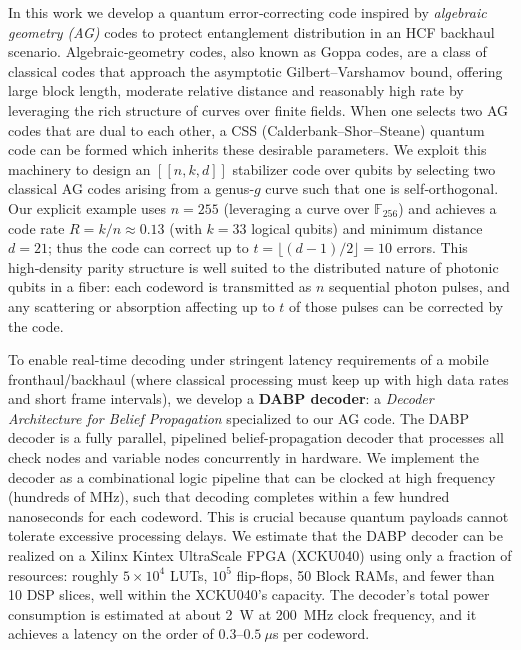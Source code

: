 \documentclass[conference]{IEEEtran}  %
\begin{document}
In this work we develop a quantum error‑correcting code inspired by \emph{algebraic geometry (AG)} codes to protect entanglement distribution in an HCF backhaul scenario.  Algebraic‑geometry codes, also known as Goppa codes, are a class of classical codes that approach the asymptotic Gilbert–Varshamov bound, offering large block length, moderate relative distance and reasonably high rate by leveraging the rich structure of curves over finite fields\cite{Nourozi2025,Steane1999}.  When one selects two AG codes that are dual to each other, a CSS (Calderbank–Shor–Steane) quantum code can be formed which inherits these desirable parameters\cite{Cross2009}.  We exploit this machinery to design an $[[n,k,d]]$ stabilizer code over qubits by selecting two classical AG codes arising from a genus‑$g$ curve such that one is self‑orthogonal.  Our explicit example uses $n=255$ (leveraging a curve over $\mathbb{F}_{256}$) and achieves a code rate $R=k/n \approx 0.13$ (with $k=33$ logical qubits) and minimum distance $d=21$; thus the code can correct up to $t=\lfloor (d-1)/2 \rfloor =10$ errors.  This high‑density parity structure is well suited to the distributed nature of photonic qubits in a fiber: each codeword is transmitted as $n$ sequential photon pulses, and any scattering or absorption affecting up to $t$ of those pulses can be corrected by the code.

To enable real-time decoding under stringent latency requirements of a mobile fronthaul/backhaul (where classical processing must keep up with high data rates and short frame intervals), we develop a \textbf{DABP decoder}: a \emph{Decoder Architecture for Belief Propagation} specialized to our AG code. The DABP decoder is a fully parallel, pipelined belief-propagation decoder that processes all check nodes and variable nodes concurrently in hardware. We implement the decoder as a combinational logic pipeline that can be clocked at high frequency (hundreds of MHz), such that decoding completes within a few hundred nanoseconds for each codeword. This is crucial because quantum payloads cannot tolerate excessive processing delays. We estimate that the DABP decoder can be realized on a Xilinx Kintex UltraScale FPGA (XCKU040) using only a fraction of resources: roughly $5\times 10^4$ LUTs, $10^5$ flip-flops, 50 Block RAMs, and fewer than 10 DSP slices, well within the XCKU040's capacity. The decoder's total power consumption is estimated at about 2~W at 200~MHz clock frequency, and it achieves a latency on the order of $0.3$--$0.5~\mu$s per codeword.
\end{document}
